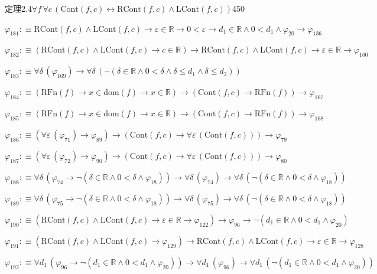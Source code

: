 \begin{fullproof}{定理2.4}{$\forall f\,\forall c\,(\mathrm{Cont}(f,c) \leftrightarrow \mathrm{RCont}(f,c) \land \mathrm{LCont}(f,c))$}{450}
\begin{abbrevlist}
\item $\varphi_{181} :\equiv \mathrm{RCont}(f,c) \land \mathrm{LCont}(f,c) \to \varepsilon \in \mathbb{R} \to 0 < \varepsilon \to d_{1} \in \mathbb{R} \land 0 < d_{1} \land \varphi_{20} \to \varphi_{136}$
\item $\varphi_{182} :\equiv (\mathrm{RCont}(f,c) \land \mathrm{LCont}(f,c) \to c \in \mathbb{R}) \to \mathrm{RCont}(f,c) \land \mathrm{LCont}(f,c) \to \varepsilon \in \mathbb{R} \to \varphi_{160}$
\item $\varphi_{183} :\equiv \forall \delta\,(\varphi_{169}) \to \forall \delta\,(\neg (\delta \in \mathbb{R} \land 0 < \delta \land \delta \leq d_{1} \land \delta \leq d_{2}))$
\item $\varphi_{184} :\equiv (\mathrm{RFn}(f) \to x \in \mathrm{dom}(f) \to x \in \mathbb{R}) \to (\mathrm{Cont}(f,c) \to \mathrm{RFn}(f)) \to \varphi_{167}$
\item $\varphi_{185} :\equiv (\mathrm{RFn}(f) \to x \in \mathrm{dom}(f) \to x \in \mathbb{R}) \to (\mathrm{Cont}(f,c) \to \mathrm{RFn}(f)) \to \varphi_{168}$
\item $\varphi_{186} :\equiv (\forall \varepsilon\,(\varphi_{71}) \to \varphi_{89}) \to (\mathrm{Cont}(f,c) \to \forall \varepsilon\,(\mathrm{Cont}(f,c))) \to \varphi_{79}$
\item $\varphi_{187} :\equiv (\forall \varepsilon\,(\varphi_{72}) \to \varphi_{90}) \to (\mathrm{Cont}(f,c) \to \forall \varepsilon\,(\mathrm{Cont}(f,c))) \to \varphi_{80}$
\item $\varphi_{188} :\equiv \forall \delta\,(\varphi_{74} \to \neg (\delta \in \mathbb{R} \land 0 < \delta \land \varphi_{18})) \to \forall \delta\,(\varphi_{74}) \to \forall \delta\,(\neg (\delta \in \mathbb{R} \land 0 < \delta \land \varphi_{18}))$
\item $\varphi_{189} :\equiv \forall \delta\,(\varphi_{75} \to \neg (\delta \in \mathbb{R} \land 0 < \delta \land \varphi_{18})) \to \forall \delta\,(\varphi_{75}) \to \forall \delta\,(\neg (\delta \in \mathbb{R} \land 0 < \delta \land \varphi_{18}))$
\item $\varphi_{190} :\equiv (\mathrm{RCont}(f,c) \land \mathrm{LCont}(f,c) \to \varepsilon \in \mathbb{R} \to \varphi_{122}) \to \varphi_{96} \to \neg (d_{1} \in \mathbb{R} \land 0 < d_{1} \land \varphi_{20})$
\item $\varphi_{191} :\equiv (\mathrm{RCont}(f,c) \land \mathrm{LCont}(f,c) \to \varphi_{129}) \to \mathrm{RCont}(f,c) \land \mathrm{LCont}(f,c) \to \varepsilon \in \mathbb{R} \to \varphi_{128}$
\item $\varphi_{192} :\equiv \forall d_{1}\,(\varphi_{96} \to \neg (d_{1} \in \mathbb{R} \land 0 < d_{1} \land \varphi_{20})) \to \forall d_{1}\,(\varphi_{96}) \to \forall d_{1}\,(\neg (d_{1} \in \mathbb{R} \land 0 < d_{1} \land \varphi_{20}))$

\end{abbrevlist}
\end{fullproof}
